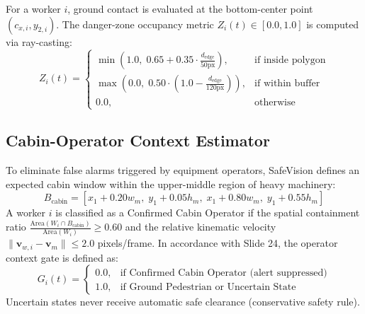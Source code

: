 \documentclass[letterpaper, 10 pt, conference]{ieeeconf}
\begin{document}
For a worker $i$, ground contact is evaluated at the bottom-center point $(c_{x,i}, y_{2,i})$. The danger-zone occupancy metric $Z_i(t) \in [0.0, 1.0]$ is computed via ray-casting:
\begin{equation}
Z_i(t) = 
\begin{cases} 
\min(1.0, \; 0.65 + 0.35 \cdot \frac{d_{\text{edge}}}{50\text{px}}), & \text{if inside polygon} \\
\max(0.0, \; 0.50 \cdot (1.0 - \frac{d_{\text{edge}}}{120\text{px}})), & \text{if within buffer} \\
0.0, & \text{otherwise}
\end{cases}
\end{equation}

\subsection{Cabin-Operator Context Estimator}
To eliminate false alarms triggered by equipment operators, SafeVision defines an expected cabin window within the upper-middle region of heavy machinery:
\begin{equation}
B_{\text{cabin}} = [x_1 + 0.20w_m, \; y_1 + 0.05h_m, \; x_1 + 0.80w_m, \; y_1 + 0.55h_m]
\end{equation}
A worker $i$ is classified as a Confirmed Cabin Operator if the spatial containment ratio $\frac{\text{Area}(W_i \cap B_{\text{cabin}})}{\text{Area}(W_i)} \ge 0.60$ and the relative kinematic velocity $\|\mathbf{v}_{w,i} - \mathbf{v}_m\| \le 2.0$ pixels/frame. In accordance with Slide 24, the operator context gate is defined as:
\begin{equation}
G_i(t) = 
\begin{cases}
0.0, & \text{if Confirmed Cabin Operator (alert suppressed)} \\
1.0, & \text{if Ground Pedestrian or Uncertain State}
\end{cases}
\end{equation}
Uncertain states never receive automatic safe clearance (conservative safety rule).
\end{document}
